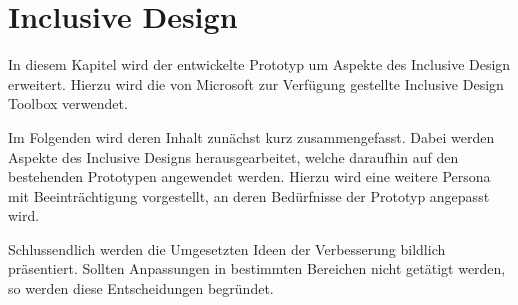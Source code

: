 \chapter{Inclusive Design}\label{sec:incdes}

In diesem Kapitel wird der entwickelte Prototyp um Aspekte des Inclusive Design erweitert.
Hierzu wird die von Microsoft zur Verfügung gestellte Inclusive Design Toolbox \cite{ITToolkit} verwendet.

Im Folgenden wird deren Inhalt zunächst kurz zusammengefasst.
Dabei werden Aspekte des Inclusive Designs herausgearbeitet, welche daraufhin auf den bestehenden Prototypen angewendet werden.
Hierzu wird eine weitere Persona mit Beeinträchtigung vorgestellt, an deren Bedürfnisse der Prototyp angepasst wird.

Schlussendlich werden die Umgesetzten Ideen der Verbesserung bildlich präsentiert.
Sollten Anpassungen in bestimmten Bereichen nicht getätigt werden, so werden diese Entscheidungen begründet.
